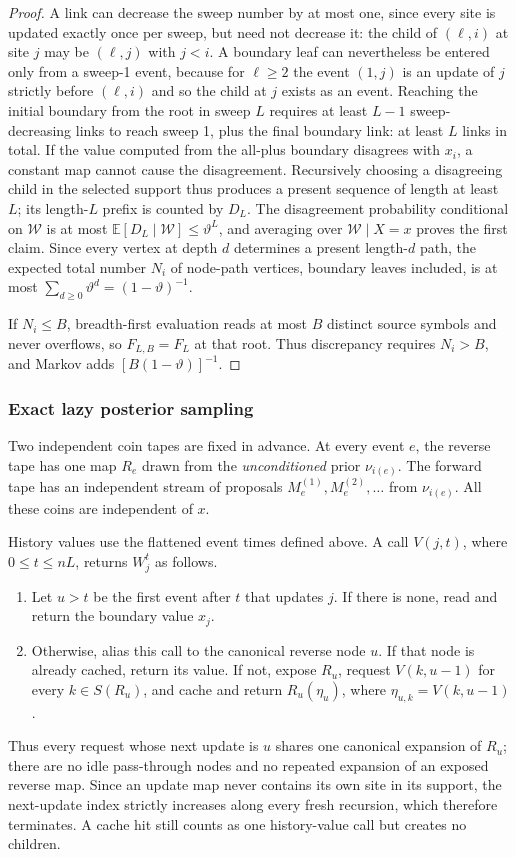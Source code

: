 \documentclass[11pt]{article}
\theoremstyle{definition}\newtheorem{definition}[theorem]{Definition}
\theoremstyle{remark}\newtheorem{remark}[theorem]{Remark}
\newcommand{\E}{\mathbb E}\newcommand{\Prb}{\mathbb P}
\begin{document}
\begin{proof}
A link can decrease the sweep number by at most one, since every site is updated exactly once per sweep, but need not decrease it: the child of \((\ell,i)\) at site \(j\) may be \((\ell,j)\) with \(j<i\). A boundary leaf can nevertheless be entered only from a sweep-1 event, because for \(\ell\ge2\) the event \((1,j)\) is an update of \(j\) strictly before \((\ell,i)\) and so the child at \(j\) exists as an event. Reaching the initial boundary from the root in sweep \(L\) requires at least \(L-1\) sweep-decreasing links to reach sweep 1, plus the final boundary link: at least \(L\) links in total. If the value computed from the all-plus boundary disagrees with \(x_i\), a constant map cannot cause the disagreement. Recursively choosing a disagreeing child in the selected support thus produces a present sequence of length at least \(L\); its length-\(L\) prefix is counted by \(D_L\). The disagreement probability conditional on \(\mathcal W\) is at most \(\E[D_L\mid\mathcal W]\le\vartheta^L\), and averaging over \(\mathcal W\mid X=x\) proves the first claim. Since every vertex at depth \(d\) determines a present length-\(d\) path, the expected total number \(N_i\) of node-path vertices, boundary leaves included, is at most \(\sum_{d\ge0}\vartheta^d=(1-\vartheta)^{-1}\).

If \(N_i\le B\), breadth-first evaluation reads at most \(B\) distinct source symbols and never overflows, so \(F_{L,B}=F_L\) at that root. Thus discrepancy requires \(N_i>B\), and Markov adds \([B(1-\vartheta)]^{-1}\).
\end{proof}

\subsubsection{Exact lazy posterior sampling}
Two independent coin tapes are fixed in advance. At every event \(e\), the reverse tape has one map \(R_e\) drawn from the \emph{unconditioned} prior \(\nu_{i(e)}\). The forward tape has an independent stream of proposals \(M_e^{(1)},M_e^{(2)},\ldots\) from \(\nu_{i(e)}\). All these coins are independent of \(x\).

History values use the flattened event times defined above. A call \(V(j,t)\), where \(0\le t\le nL\), returns \(W^t_j\) as follows.
\begin{enumerate}
\item Let \(u>t\) be the first event after \(t\) that updates \(j\). If there is none, read and return the boundary value \(x_j\).
\item Otherwise, alias this call to the canonical reverse node \(u\). If that node is already cached, return its value. If not, expose \(R_u\), request \(V(k,u-1)\) for every \(k\in S(R_u)\), and cache and return \(R_u(\eta_u)\), where \(\eta_{u,k}=V(k,u-1)\).
\end{enumerate}
Thus every request whose next update is \(u\) shares one canonical expansion of \(R_u\); there are no idle pass-through nodes and no repeated expansion of an exposed reverse map. Since an update map never contains its own site in its support, the next-update index strictly increases along every fresh recursion, which therefore terminates. A cache hit still counts as one history-value call but creates no children.
\end{document}

